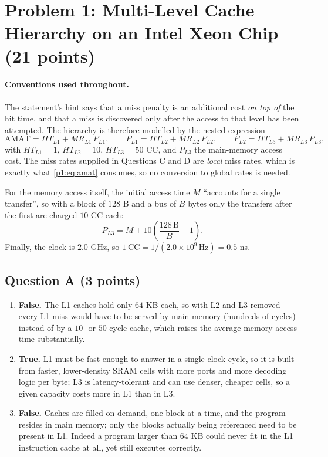 \section*{Problem 1: Multi-Level Cache Hierarchy on an Intel Xeon Chip (21 points)}

\paragraph{Conventions used throughout.}
The statement's hint says that a miss penalty is an additional cost \emph{on top of} the
hit time, and that a miss is discovered only after the access to that level has been
attempted. The hierarchy is therefore modelled by the nested expression
\begin{equation}
\label{p1:eq:amat}
\mathrm{AMAT}=HT_{L1}+MR_{L1}\,P_{L1},\qquad
P_{L1}=HT_{L2}+MR_{L2}\,P_{L2},\qquad
P_{L2}=HT_{L3}+MR_{L3}\,P_{L3},
\end{equation}
with $HT_{L1}=1$, $HT_{L2}=10$, $HT_{L3}=50$ CC, and $P_{L3}$ the main-memory access
cost. The miss rates supplied in Questions C and D are \emph{local} miss rates, which is
exactly what \eqref{p1:eq:amat} consumes, so no conversion to global rates is needed.

For the memory access itself, the initial access time $M$ ``accounts for a single
transfer'', so with a block of $128$ B and a bus of $B$ bytes only the transfers after
the first are charged $10$ CC each:
\begin{equation}
\label{p1:eq:pl3}
P_{L3}=M+10\left(\frac{128\,\mathrm{B}}{B}-1\right).
\end{equation}
Finally, the clock is $2.0$ GHz, so $1\ \mathrm{CC}=1/(2.0\times10^{9}\,\mathrm{Hz})=0.5$ ns.

\subsection*{Question A (3 points)}

\begin{enumerate}
  \item[(1)] \textbf{False.} The L1 caches hold only $64$ KB each, so with L2 and L3
  removed every L1 miss would have to be served by main memory (hundreds of cycles)
  instead of by a $10$- or $50$-cycle cache, which raises the average memory access time
  substantially.

  \item[(2)] \textbf{True.} L1 must be fast enough to answer in a single clock cycle, so
  it is built from faster, lower-density SRAM cells with more ports and more decoding
  logic per byte; L3 is latency-tolerant and can use denser, cheaper cells, so a given
  capacity costs more in L1 than in L3.

  \item[(3)] \textbf{False.} Caches are filled on demand, one block at a time, and the
  program resides in main memory; only the blocks actually being referenced need to be
  present in L1. Indeed a program larger than $64$ KB could never fit in the L1
  instruction cache at all, yet still executes correctly.
\end{enumerate}

